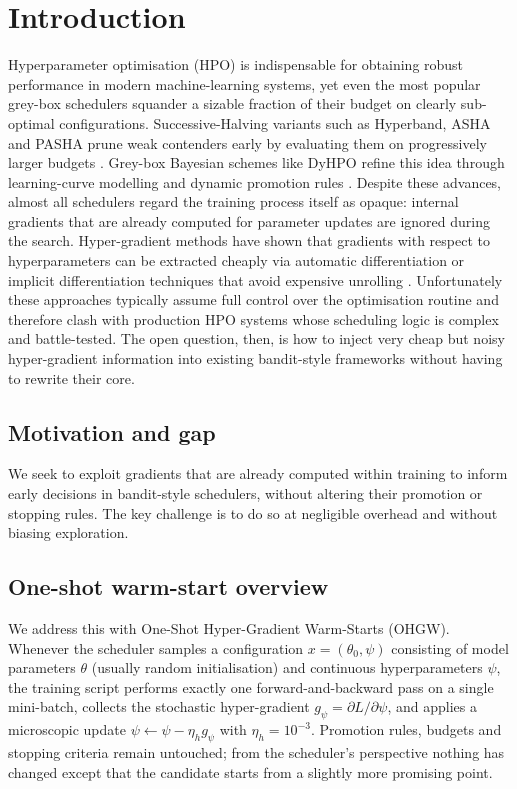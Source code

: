 \documentclass{article}
\begin{document}
\section{Introduction}
Hyperparameter optimisation (HPO) is indispensable for obtaining robust performance in modern machine-learning systems, yet even the most popular grey-box schedulers squander a sizable fraction of their budget on clearly sub-optimal configurations. Successive-Halving variants such as Hyperband, ASHA and PASHA prune weak contenders early by evaluating them on progressively larger budgets \cite{bohdal-2022-pasha}. Grey-box Bayesian schemes like DyHPO refine this idea through learning-curve modelling and dynamic promotion rules \cite{wistuba-2022-supervising}. Despite these advances, almost all schedulers regard the training process itself as opaque: internal gradients that are already computed for parameter updates are ignored during the search. Hyper-gradient methods have shown that gradients with respect to hyperparameters can be extracted cheaply via automatic differentiation \cite{chandra-2019-gradient} or implicit differentiation techniques that avoid expensive unrolling \cite{bertrand-2020-implicit}. Unfortunately these approaches typically assume full control over the optimisation routine and therefore clash with production HPO systems whose scheduling logic is complex and battle-tested. The open question, then, is how to inject very cheap but noisy hyper-gradient information into existing bandit-style frameworks without having to rewrite their core.

\subsection{Motivation and gap}
We seek to exploit gradients that are already computed within training to inform early decisions in bandit-style schedulers, without altering their promotion or stopping rules. The key challenge is to do so at negligible overhead and without biasing exploration.

\subsection{One-shot warm-start overview}
We address this with One-Shot Hyper-Gradient Warm-Starts (OHGW). Whenever the scheduler samples a configuration \(x=(\theta_0,\psi)\) consisting of model parameters \(\theta\) (usually random initialisation) and continuous hyperparameters \(\psi\), the training script performs exactly one forward-and-backward pass on a single mini-batch, collects the stochastic hyper-gradient \(g_{\psi}=\partial L/\partial \psi\), and applies a microscopic update \(\psi \leftarrow \psi - \eta_h g_{\psi}\) with \(\eta_h = 10^{-3}\). Promotion rules, budgets and stopping criteria remain untouched; from the scheduler’s perspective nothing has changed except that the candidate starts from a slightly more promising point.
\end{document}
